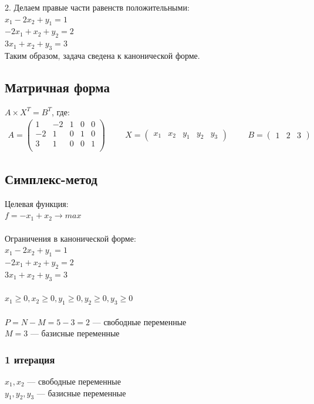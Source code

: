 \documentclass[14pt,a4paper,fleqn]{extarticle}
\begin{document}
2. Делаем правые части равенств положительными:\\
$x_1 - 2x_2 + y_1 = 1$\\
$-2x_1 + x_2 + y_2 = 2$\\
$3x_1 + x_2 + y_3 = 3$\\

Таким образом, задача сведена к канонической форме.

\subsection*{Матричная форма}
$A \times X^T = B^T$, где:
\begin{align*}
	A = \begin{pmatrix}
		1 & -2 & 1 & 0 & 0\\
		-2 & 1 & 0 & 1 & 0\\
		3 & 1 & 0 & 0 & 1\\
		\end{pmatrix}
	\hspace{1cm}
	X = \begin{pmatrix}
		x_1 & x_2 & y_1 & y_2 & y_3
	\end{pmatrix}
	\hspace{1cm}
	B = \begin{pmatrix}
		1 & 2 & 3
	\end{pmatrix}
\end{align*}
\newpage

\subsection*{Симплекс-метод}
Целевая функция:\\
$f = -x_1 + x_2 \longrightarrow max$\\\\
Ограничения в канонической форме:\\
$x_1 - 2x_2 + y_1 = 1$\\
$-2x_1 + x_2 + y_2 = 2$\\
$3x_1 + x_2 + y_3 = 3$\\\\
$x_1 \geq 0, x_2 \geq 0, y_1 \geq 0, y_2 \geq 0, y_3 \geq 0$\\\\
$P = N - M = 5 - 3 = 2$ --- свободные переменные\\
$M = 3$ --- базисные переменные
\subsubsection*{1 итерация}
$x_1, x_2$ --- свободные переменные\\
$y_1, y_2, y_3$ --- базисные переменные\\
\end{document}
